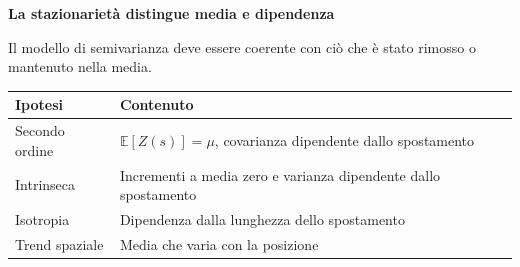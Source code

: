 \documentclass[12pt,aspectratio=1610]{beamer}
\newcommand{\PilotChrome}[4]{%
  \node[anchor=north west,inner sep=0,text width=17.7cm] at ([xshift=.95cm,yshift=-.55cm]current page.north west) {\color{Navy}\bfseries\fontsize{20.6}{24.5}\selectfont #1};
  \node[anchor=north east,inner sep=0] at ([xshift=19.05cm,yshift=-.14cm]current page.north west) {\color{Classical}\fontsize{8}{10}\selectfont\hyperlink{slide2}{#2}};
  \draw[Classical,line width=1.2pt] ([xshift=.95cm,yshift=-1.7cm]current page.north west)--([xshift=2.35cm,yshift=-1.7cm]current page.north west);
  \draw[Rule,line width=.65pt] ([xshift=.95cm,yshift=-10.36cm]current page.north west)--([xshift=19.05cm,yshift=-10.36cm]current page.north west);
  \node[anchor=north west,inner sep=0] at ([xshift=.96cm,yshift=-10.55cm]current page.north west) {\color{Classical}\bfseries\fontsize{9.1}{12}\selectfont DA RICORDARE};
  \node[anchor=north west,inner sep=0,text width=14.3cm] at ([xshift=4.2cm,yshift=-10.53cm]current page.north west) {\color{Ink}\fontsize{10.3}{13.8}\selectfont #4};
  \draw[Rule,line width=.35pt] ([xshift=.95cm,yshift=-11.92cm]current page.north west)--([xshift=19.05cm,yshift=-11.92cm]current page.north west);
  \node[anchor=north west,inner sep=0] at ([xshift=.95cm,yshift=-12.06cm]current page.north west) {\color{Muted}\fontsize{7.7}{9.2}\selectfont Locus: statistica spaziale};
  \node[anchor=north east,inner sep=0] at ([xshift=19.05cm,yshift=-12.06cm]current page.north west) {\color{Muted}\fontsize{7.7}{9.2}\selectfont #3/110};
}
\begin{document}
\begin{frame}[plain]
\end{frame}

\begin{frame}[plain]\hypertarget{slide76}{}
\begin{lrbox}{\TitleBox}
\begin{minipage}[t]{17.7cm}\raggedright\color{Ink}\fontsize{11.3}{14.8}\selectfont
\color{Navy}\bfseries\fontsize{20.6}{24.5}\selectfont La stazionarietà distingue media e dipendenza
\end{minipage}\end{lrbox}

\begin{lrbox}{\RecallBox}
\begin{minipage}[t]{14.3cm}\raggedright\color{Ink}\fontsize{11.3}{14.8}\selectfont
\fontsize{10.3}{13.8}\selectfont Il modello di semivarianza deve essere coerente con ciò che è stato rimosso o mantenuto nella media.
\end{minipage}\end{lrbox}

\begin{lrbox}{\PilotLeftBox}
\begin{minipage}[t]{10.05cm}\raggedright\color{Ink}\fontsize{11.3}{14.8}\selectfont
{\fontsize{10.2}{13.1}\selectfont\renewcommand{\arraystretch}{1.45}\begin{tabular}{@{}p{3.1cm}p{5.9cm}@{}}\toprule
\textbf{Ipotesi} & \textbf{Contenuto}\\\midrule
Secondo ordine & $\mathbb E[Z(s)]=\mu$, covarianza dipendente dallo spostamento\\
Intrinseca & Incrementi a media zero e varianza dipendente dallo spostamento\\
Isotropia & Dipendenza dalla lunghezza dello spostamento\\
Trend spaziale & Media che varia con la posizione\\
\bottomrule\end{tabular}}


\end{minipage}
\end{lrbox}
\end{frame}
\end{document}
